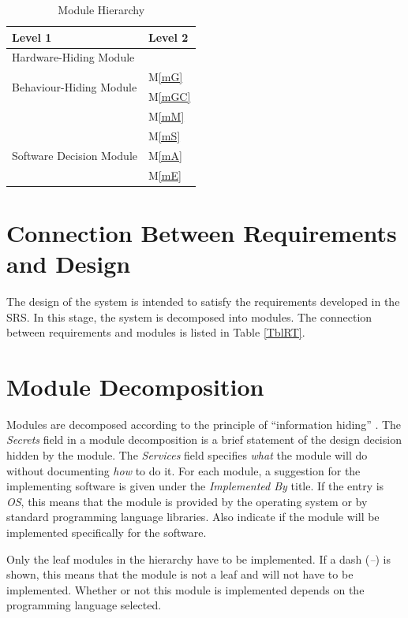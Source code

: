 \documentclass[12pt, titlepage]{article}
\newcommand{\mref}[1]{M\ref{#1}}
\begin{document}
\begin{table}[h!]
\centering
\begin{tabular}{p{} p{}}
\toprule
\textbf{Level 1} & \textbf{Level 2}\\
\midrule

{Hardware-Hiding Module} & ~ \\
\midrule

\multirow{2}{0.3\textwidth}{Behaviour-Hiding Module}
& \mref{mG}\\
& \mref{mGC}\\
& \mref{mM}\\
\midrule

\multirow{3}{0.3\textwidth}{Software Decision Module} 
& \mref{mS}\\
& \mref{mA}\\
& \mref{mE}\\
\bottomrule

\end{tabular}
\caption{Module Hierarchy}
\label{TblMH}
\end{table}

\section{Connection Between Requirements and Design} \label{SecConnection}

The design of the system is intended to satisfy the requirements developed in
the SRS. In this stage, the system is decomposed into modules. The connection
between requirements and modules is listed in Table \ref{TblRT}.


\section{Module Decomposition} \label{SecMD}

Modules are decomposed according to the principle of ``information hiding''
. The \emph{Secrets} field in a module
decomposition is a brief statement of the design decision hidden by the
module. The \emph{Services} field specifies \emph{what} the module will do
without documenting \emph{how} to do it. For each module, a suggestion for the
implementing software is given under the \emph{Implemented By} title. If the
entry is \emph{OS}, this means that the module is provided by the operating
system or by standard programming language libraries.  Also indicate if the
module will be implemented specifically for the software.

Only the leaf modules in the
hierarchy have to be implemented. If a dash (\emph{--}) is shown, this means
that the module is not a leaf and will not have to be implemented. Whether or
not this module is implemented depends on the programming language
selected.
\end{document}
